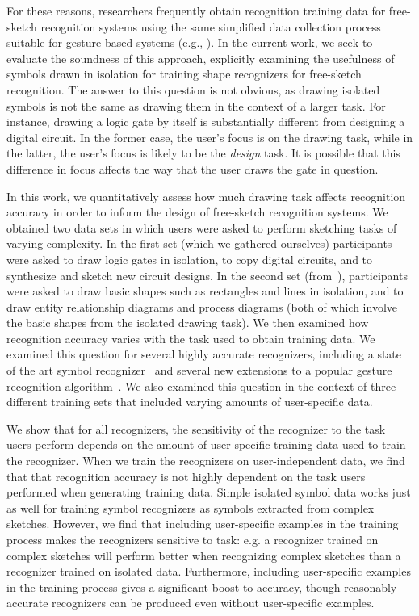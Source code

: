 \documentclass[final,5p,twocolumn]{elsarticle}
\begin{document}
For these reasons, researchers frequently obtain recognition training
data for free-sketch recognition systems using the same simplified
data collection process suitable for gesture-based systems (e.g.,
\cite{kara05,hse04}). In the current work, we seek to
evaluate the soundness of this approach, explicitly examining the usefulness
of symbols drawn in isolation for training shape recognizers for
free-sketch recognition.  The answer to this question is not obvious,
as drawing isolated symbols is not the same as drawing them in the
context of a larger task. For instance, drawing a logic gate by itself
is substantially different from designing a digital circuit.  In the
former case, the user's focus is on the drawing task, while in the
latter, the user's focus is likely to be the \textit{design} task.  
It is possible that this difference in focus affects the way that 
the user draws the gate in question.

In this work, we quantitatively assess how much drawing task affects recognition 
accuracy in order to inform the design of free-sketch recognition 
systems.  We obtained two data sets in which users were asked to perform
sketching tasks of varying complexity.  In the first set (which we gathered
ourselves) participants were asked to draw logic gates
in isolation, to copy digital circuits, and to synthesize and sketch new
circuit designs.  In the second set (from~\cite{schmieder09}), participants
were asked to draw basic shapes such as rectangles and lines in isolation, 
and to draw entity relationship diagrams and process diagrams (both
of which involve the basic shapes from the isolated drawing task).  
We then examined how recognition accuracy varies
with the task used to obtain training data.  We examined this 
question for several highly accurate recognizers, including a state of the
art symbol recognizer~\cite{kara05} and several 
new extensions to a popular gesture 
recognition algorithm~\cite{wobbrock07}. We also examined this question
in the context of three different training sets that included varying 
amounts of user-specific data.  

We show that for all recognizers, the sensitivity of the recognizer 
to the task users perform depends on the amount of user-specific 
training data used to train the recognizer.  When we train the 
recognizers on user-independent data, we find that 
that recognition accuracy is not highly dependent on the task
users performed when generating training data.  Simple isolated symbol
data works just as well for training symbol recognizers as symbols
extracted from complex sketches. However, we find that including user-specific examples
in the training process makes the recognizers sensitive to task: 
e.g. a recognizer trained on complex sketches will perform better
when recognizing complex sketches than a recognizer trained on isolated data.
Furthermore, including
user-specific examples in the training process gives a significant
boost to accuracy, though reasonably accurate recognizers
can be produced even without user-specific examples.  
\end{document}
